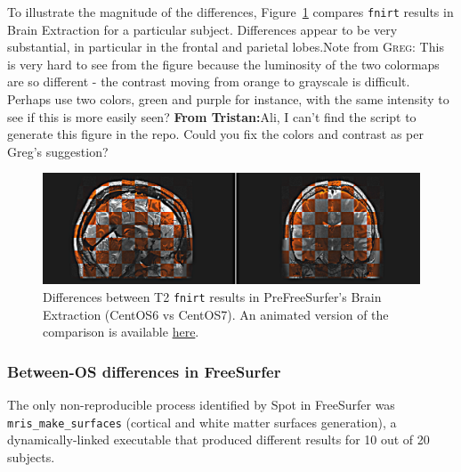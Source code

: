 \documentclass[a4paper,num-refs]{oup-contemporary}
\newcommand{\note}[2]{\color{blue}Note from \textsc{#1}: #2\color{black}}
\newcommand{\tristan}[1]{\color{orange}\textbf{From Tristan:}#1\color{black}}
\newcommand{\toolname}[0]{Spot\xspace}
\newcommand{\fnirt}[0]{\texttt{fnirt}\xspace}
\begin{document}
To illustrate the magnitude of the differences,
Figure~\ref{fig:fnirt_result} compares \fnirt results in Brain Extraction
for a particular subject. Differences appear to be very substantial, in
particular in the frontal and parietal lobes.\note{Greg}{This is very hard to see from the figure because the
luminosity of the two colormaps are so different - the contrast moving from orange to grayscale is difficult. Perhaps use two colors, green and purple for instance, with the same intensity to see if this is more easily seen?} 
\tristan{Ali, I can't find the script to generate this figure in the repo. Could you fix the colors and contrast as per Greg's suggestion?}
\begin{figure}
  \centering
    \includegraphics[width=\columnwidth]{figures/t2w_alignment.png} 
    \caption{Differences between T2 \fnirt results in PreFreeSurfer's Brain Extraction (CentOS6 vs 
    CentOS7). An animated version of the comparison is available \href{https://github.com/big-data-lab-team/HCP-reproducibility-paper/blob/master/figures/pfs_t2w_alignment.gif}{here}.}
    \label{fig:fnirt_result}
\end{figure}

\subsubsection{Between-OS differences in FreeSurfer} 

The only non-reproducible process identified by \toolname in FreeSurfer was
\texttt{mris\_make\_surfaces} (cortical and white matter surfaces
generation), a dynamically-linked executable 
that produced different results for
10 out of 20 subjects. 
\end{document}
